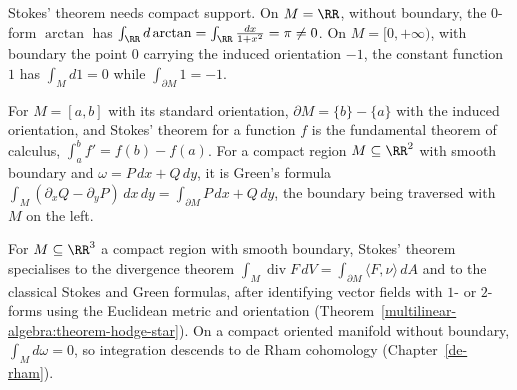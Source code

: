 \begin{counterexample}\label{differential-forms:counterexample-stokes-support}
Stokes' theorem needs compact support. On $M = \RR$, without boundary, the $0$-form $\arctan$ has $\int_\RR d\arctan = \int_\RR\frac{dx}{1 + x^2} = \pi \neq 0$. On $M = [0, +\infty)$, with boundary the point $0$ carrying the induced orientation $-1$,
the constant function $1$ has $\int_Md1 = 0$ while $\int_{\partial M}1 = -1$.
\end{counterexample}

\begin{example}\label{differential-forms:example-stokes-dimension-one}
For $M = [a, b]$ with its standard orientation, $\partial M = \{b\} - \{a\}$ with the induced orientation, and Stokes' theorem for a function $f$ is the fundamental theorem of calculus, $\int_a^bf' = f(b) - f(a)$. For a compact region
$M \subseteq \RR^2$ with smooth boundary and $\omega = P\,dx + Q\,dy$, it is Green's formula $\int_M(\partial_xQ - \partial_yP)\,dx\,dy = \int_{\partial M}P\,dx + Q\,dy$, the boundary being traversed with $M$ on the left.
\end{example}

\begin{example}\label{differential-forms:example-classical}
For $M \subseteq \RR^3$ a compact region with smooth boundary, Stokes' theorem specialises to the divergence theorem $\int_M\operatorname{div}F\,dV = \int_{\partial M}\langle F, \nu\rangle\,dA$ and to the classical
Stokes and Green formulas, after identifying vector fields with $1$- or $2$-forms using the Euclidean metric and orientation (Theorem~\ref{multilinear-algebra:theorem-hodge-star}). On a compact oriented
manifold without boundary, $\int_M d\omega = 0$, so integration descends to de Rham cohomology (Chapter~\ref{de-rham}).
\end{example}

